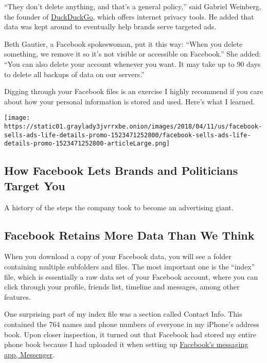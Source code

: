 ``They don't delete anything, and that's a general policy,'' said
Gabriel Weinberg, the founder of
\href{https://www.nytimes3xbfgragh.onion/2014/04/03/technology/personaltech/sweeping-away-a-search-history.html}{DuckDuckGo},
which offers internet privacy tools. He added that data was kept around
to eventually help brands serve targeted ads.

Beth Gautier, a Facebook spokeswoman, put it this way: ``When you delete
something, we remove it so it's not visible or accessible on Facebook.''
She added: ``You can also delete your account whenever you want. It may
take up to 90 days to delete all backups of data on our servers.''

Digging through your Facebook files is an exercise I highly recommend if
you care about how your personal information is stored and used. Here's
what I learned.

\href{https://www.nytimes3xbfgragh.onion/interactive/2018/04/11/technology/facebook-sells-ads-life-details.html}{}

\texttt{[image: https://static01.graylady3jvrrxbe.onion/images/2018/04/11/us/facebook-sells-ads-life-details-promo-1523471252800/facebook-sells-ads-life-details-promo-1523471252800-articleLarge.png]}

\hypertarget{how-facebook-lets-brands-and-politicians-target-you}{%
\subsection{How Facebook Lets Brands and Politicians Target
You}\label{how-facebook-lets-brands-and-politicians-target-you}}

A history of the steps the company took to become an advertising giant.

\hypertarget{facebook-retains-more-data-than-we-think}{%
\subsection{Facebook Retains More Data Than We
Think}\label{facebook-retains-more-data-than-we-think}}

When you download a copy of your Facebook data, you will see a folder
containing multiple subfolders and files. The most important one is the
``index'' file, which is essentially a raw data set of your Facebook
account, where you can click through your profile, friends list,
timeline and messages, among other features.

One surprising part of my index file was a section called Contact Info.
This contained the 764 names and phone numbers of everyone in my
iPhone's address book. Upon closer inspection, it turned out that
Facebook had stored my entire phone book because I had uploaded it when
setting up
\href{https://www.nytimes3xbfgragh.onion/2018/03/27/technology/personaltech/facebook-messenger-uninstall.html}{Facebook's
messaging app, Messenger}.

